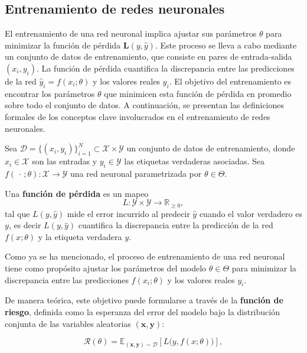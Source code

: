 \subsection{Entrenamiento de redes neuronales}

El entrenamiento de una red neuronal implica ajustar sus parámetros $\theta$ para minimizar la función de pérdida $\mathbf{L}(y,\hat{y})$. Este proceso se lleva a cabo mediante un conjunto de datos de entrenamiento, que consiste en pares de entrada-salida $(x_i, y_i)$. La función de pérdida cuantifica la discrepancia entre las predicciones de la red $\hat{y}_i = f(x_i;\theta)$ y los valores reales $y_i$. El objetivo del entrenamiento es encontrar los parámetros $\theta$ que minimicen esta función de pérdida en promedio sobre todo el conjunto de datos. A continuación, se presentan las definiciones formales de los conceptos clave involucrados en el entrenamiento de redes neuronales.

\begin{definition}
    Sea $\mathcal{D} = \{(x_i,y_i)\}_{i=1}^N \subset \mathcal{X} \times \mathcal{Y}$ un conjunto de datos de entrenamiento, donde $x_i \in \mathcal{X}$ son las entradas y $y_i \in \mathcal{Y}$ las etiquetas verdaderas asociadas.
    Sea $f(\,\cdot\,;\theta): \mathcal{X} \to \mathcal{Y}$ una red neuronal parametrizada por $\theta \in \Theta$.

    Una \textbf{función de pérdida} es un mapeo
    \[
        L : \mathcal{Y} \times \mathcal{Y} \longrightarrow \mathbb{R}_{\geq 0},
    \]
    tal que $L(y,\hat{y})$ mide el error incurrido al predecir $\hat{y}$ cuando el valor verdadero es $y$, es decir $L(y,\hat{y})$ cuantifica la discrepancia entre la predicción de la red $f(x;\theta)$ y la etiqueta verdadera $y$.
\end{definition}


Como ya se ha mencionado, el proceso de entrenamiento de una red neuronal tiene como propósito ajustar los parámetros del modelo $\theta \in \Theta$ para minimizar la discrepancia entre las predicciones $f(x_i; \theta)$ y los valores reales $y_i$.

De manera teórica, este objetivo puede formularse a través de la \textbf{función de riesgo}, definida como la esperanza del error del modelo bajo la distribución conjunta de las variables aleatorias $(\mathbf{x}, \mathbf{y})$:

\begin{equation}
    \mathcal{R}(\theta) = \mathbb{E}_{(\mathbf{x},\mathbf{y}) \sim \mathcal{D}} \left[ L\bigl(y, f(x; \theta)\bigr) \right],
\end{equation}

